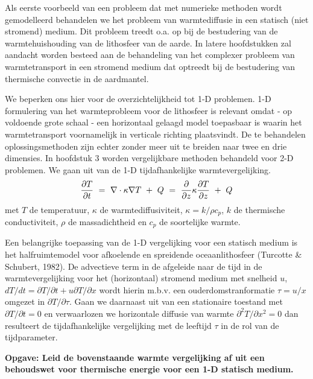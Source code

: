 Als eerste voorbeeld van een probleem dat met numerieke methoden
wordt gemodelleerd behandelen we het probleem van warmtediffusie
in een statisch (niet stromend) medium.
Dit probleem treedt o.a. op bij de bestudering van de
warmtehuishouding van de lithosfeer van de aarde.
In latere hoofdstukken zal aandacht worden besteed aan de behandeling
van het complexer probleem van warmtetransport in een stromend medium
dat optreedt bij de bestudering van thermische convectie in de 
aardmantel.

We beperken ons hier voor de overzichtelijkheid tot 1-D problemen.
1-D formulering van het warmteprobleem voor de lithosfeer is relevant 
omdat - op voldoende grote schaal - een horizontaal gelaagd model
toepasbaar is waarin het warmtetransport voornamelijk in
verticale richting plaatsvindt.
De te behandelen oplossingsmethoden zijn echter zonder meer uit te 
breiden naar twee en drie dimensies.
In hoofdstuk 3 worden vergelijkbare methoden behandeld voor 2-D 
problemen.
We gaan uit van de 1-D tijdafhankelijke warmtevergelijking.
\begin{equation}
     {\partial  T \over \partial t} \ =\ 
     \nabla \cdot \kappa \nabla T \ +\  Q \ =\ 
     {\partial  \over \partial z} \kappa
     {\partial  T \over \partial z} \ +\ Q
\end{equation}
met $T$ de temperatuur, $\kappa$ de warmtediffusiviteit,
$\kappa = k / \rho c_p$, $k$ de thermische conductiviteit,
$\rho$ de massadichtheid en $c_p$ de 
soortelijke warmte.

Een belangrijke toepassing van de 1-D vergelijking voor een statisch
medium is het halfruimtemodel voor afkoelende en spreidende oceaanlithosfeer
(Turcotte \& Schubert, 1982).
De advectieve term in de afgeleide naar de tijd in de warmtevergelijking
voor het (horizontaal) stromend medium met snelheid $u$,
$dT/dt = \partial T / \partial t + u \partial T / \partial x$
wordt hierin m.b.v. een ouderdomstranformatie $\tau = u/x$ omgezet
in $\partial T/ \partial \tau$.
Gaan we daarnaast uit van een stationaire toestand met 
$\partial T / \partial t = 0$ en verwaarlozen we horizontale
diffusie van warmte $\partial ^2 T / \partial x ^ 2 = 0$ dan
resulteert de tijdafhankelijke vergelijking met de leeftijd
$\tau$ in de rol van de tijdparameter.

\vspace{0.5cm}
\noindent
\bf Opgave:\rm
\newline
\small
Leid de bovenstaande warmte vergelijking af uit een behoudswet voor
thermische energie voor een 1-D statisch medium.
\normalsize
\vspace{0.5cm}

